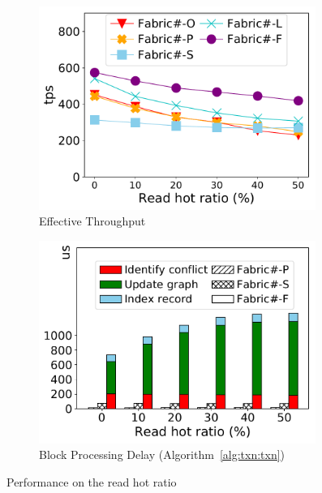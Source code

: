 \begin{figure}[t]
	\centering
    \begin{subfigure}{0.45\textwidth}
      \includegraphics[width=0.99\textwidth]{chart/txn/complex_readhot_thruput.pdf}
      \caption{Effective Throughput}
      \label{chart:txn:readhot:thruput}
    \end{subfigure}
    \begin{subfigure}{0.45\textwidth}
      \includegraphics[width=0.99\textwidth]{chart/txn/complex_readhot_txn_delay.pdf}
      \caption{Block Processing Delay (Algorithm~\ref{alg:txn:txn})}
      \label{chart:txn:readhot:delay}
    \end{subfigure}
    \caption{Performance on the read hot ratio}
    \label{chart:txn:readhot}
\end{figure}

